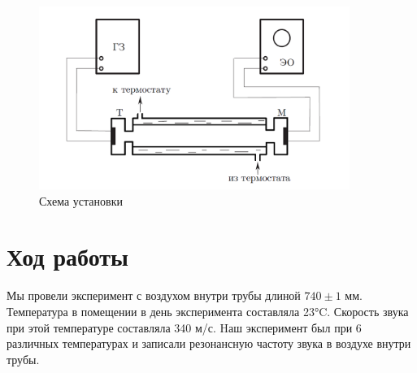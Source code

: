\documentclass[a4paper, 12pt]{article}%
\begin{document}
\begin{figure}[h]
\begin{center}
\includegraphics[width = 0.9\textwidth]{fig1.png}
\caption{Схема установки}
\end{center}
\end{figure}

\newpage
\section{Ход работы}
Мы провели эксперимент с воздухом внутри трубы длиной $740 \pm 1$
 мм. Температура в помещении в день эксперимента составляла 23°C. Скорость звука при этой температуре составляла 340 м/с. Hаш эксперимент был при 6 различных температурах и записали резонансную частоту звука в воздухе внутри трубы.\\
\end{document}
